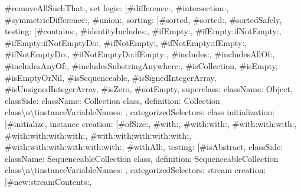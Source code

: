 {\textquotedbl{}\#removeAllSuchThat:\textquotedbl{}{]}, \textquotedbl{}set logic\textquotedbl{}: {[}\textquotedbl{}\#difference:\textquotedbl{}, \textquotedbl{}\#intersection:\textquotedbl{}, \textquotedbl{}\#symmetricDifference:\textquotedbl{}, \textquotedbl{}\#union:\textquotedbl{}{]}, \textquotedbl{}sorting\textquotedbl{}: {[}\textquotedbl{}\#sorted\textquotedbl{}, \textquotedbl{}\#sorted:\textquotedbl{}, \textquotedbl{}\#sortedSafely\textquotedbl{}{]}, \textquotedbl{}testing\textquotedbl{}: {[}\textquotedbl{}\#contains:\textquotedbl{}, \textquotedbl{}\#identityIncludes:\textquotedbl{}, \textquotedbl{}\#ifEmpty:\textquotedbl{}, \textquotedbl{}\#ifEmpty:ifNotEmpty:\textquotedbl{}, \textquotedbl{}\#ifEmpty:ifNotEmptyDo:\textquotedbl{}, \textquotedbl{}\#ifNotEmpty:\textquotedbl{}, \textquotedbl{}\#ifNotEmpty:ifEmpty:\textquotedbl{}, \textquotedbl{}\#ifNotEmptyDo:\textquotedbl{}, \textquotedbl{}\#ifNotEmptyDo:ifEmpty:\textquotedbl{}, \textquotedbl{}\#includes:\textquotedbl{}, \textquotedbl{}\#includesAllOf:\textquotedbl{}, \textquotedbl{}\#includesAnyOf:\textquotedbl{}, \textquotedbl{}\#includesSubstringAnywhere:\textquotedbl{}, \textquotedbl{}\#isCollection\textquotedbl{}, \textquotedbl{}\#isEmpty\textquotedbl{}, \textquotedbl{}\#isEmptyOrNil\textquotedbl{}, \textquotedbl{}\#isSequenceable\textquotedbl{}, \textquotedbl{}\#isSignedIntegerArray\textquotedbl{}, \textquotedbl{}\#isUnsignedIntegerArray\textquotedbl{}, \textquotedbl{}\#isZero\textquotedbl{}, \textquotedbl{}\#notEmpty\textquotedbl{}{]}\textbraceright , \textquotedbl{}superclass\textquotedbl{}: \textbraceleft \textquotedbl{}className\textquotedbl{}: \textquotedbl{}Object\textquotedbl{}\textbraceright , \textquotedbl{}classSide\textquotedbl{}: \textbraceleft \textquotedbl{}className\textquotedbl{}: \textquotedbl{}Collection class\textquotedbl{}, \textquotedbl{}definition\textquotedbl{}: \textquotedbl{}Collection class\allowbreak\textbackslash n\allowbreak\textbackslash tinstanceVariableNames: \textquotesingle{}\textquotesingle{}\textquotedbl{}, \textquotedbl{}categorizedSelectors\textquotedbl{}: \textbraceleft \textquotedbl{}class initialization\textquotedbl{}: {[}\textquotedbl{}\#initialize\textquotedbl{}{]}, \textquotedbl{}instance creation\textquotedbl{}: {[}\textquotedbl{}\#ofSize:\textquotedbl{}, \textquotedbl{}\#with:\textquotedbl{}, \textquotedbl{}\#with:with:\textquotedbl{}, \textquotedbl{}\#with:with:with:\textquotedbl{}, \textquotedbl{}\#with:with:with:with:\textquotedbl{}, \textquotedbl{}\#with:with:with:with:with:\textquotedbl{}, \textquotedbl{}\#with:with:with:with:with:with:\textquotedbl{}, \textquotedbl{}\#withAll:\textquotedbl{}{]}, \textquotedbl{}testing\textquotedbl{}: {[}\textquotedbl{}\#isAbstract\textquotedbl{}{]}\textbraceright \textbraceright \textbraceright , \textquotedbl{}classSide\textquotedbl{}: \textbraceleft \textquotedbl{}className\textquotedbl{}: \textquotedbl{}SequenceableCollection class\textquotedbl{}, \textquotedbl{}definition\textquotedbl{}: \textquotedbl{}SequenceableCollection class\allowbreak\textbackslash n\allowbreak\textbackslash tinstanceVariableNames: \textquotesingle{}\textquotesingle{}\textquotedbl{}, \textquotedbl{}categorizedSelectors\textquotedbl{}: \textbraceleft \textquotedbl{}stream creation\textquotedbl{}: {[}\textquotedbl{}\#new:streamContents:\textquotedbl{}, }
